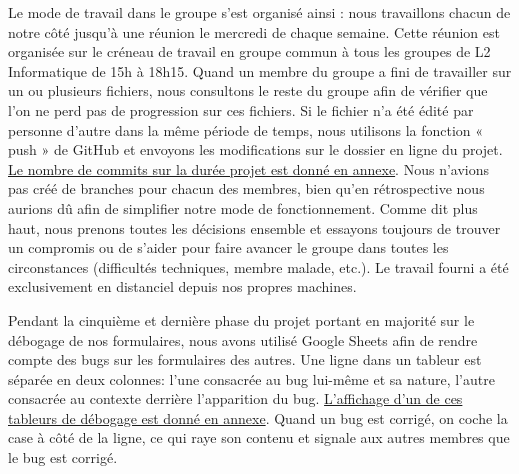 \documentclass[12pt]{report}
\begin{document}
        \bigskip
        \par
        \hypertarget{bdd-retour-gestion}{}
        Le mode de travail dans le groupe s’est organisé ainsi : nous travaillons chacun de notre côté jusqu’à une réunion le mercredi de chaque semaine. Cette réunion est organisée sur le créneau de travail en groupe commun à tous les groupes de L2 Informatique de 15h à 18h15. Quand un membre du groupe a fini de travailler sur un ou plusieurs fichiers, nous consultons le reste du groupe afin de vérifier que l’on ne perd pas de progression sur ces fichiers. Si le fichier n’a été édité par personne d’autre dans la même période de temps, nous utilisons la fonction « push » de GitHub et envoyons les modifications sur le dossier en ligne du projet. \hyperlink{annexe-gestion}{Le nombre de commits sur la durée projet est donné en annexe}. Nous n'avions pas créé de branches pour chacun des membres, bien qu'en rétrospective nous aurions dû afin de simplifier notre mode de fonctionnement. Comme dit plus haut, nous prenons toutes les décisions ensemble et essayons toujours de trouver un compromis ou de s’aider pour faire avancer le groupe dans toutes les circonstances (difficultés techniques, membre malade, etc.). Le travail fourni a été exclusivement en distanciel depuis nos propres machines.
        
        \bigskip
        \par
        Pendant la cinquième et dernière phase du projet portant en majorité sur le débogage de nos formulaires, nous avons utilisé Google Sheets afin de rendre compte des bugs sur les formulaires des autres. Une ligne dans un tableur est séparée en deux colonnes: l'une consacrée au bug lui-même et sa nature, l'autre consacrée au contexte derrière l'apparition du bug. \hyperlink{annexe-gestion}{L'affichage d'un de ces tableurs de débogage est donné en annexe}. Quand un bug est corrigé, on coche la case à côté de la ligne, ce qui raye son contenu et signale aux autres membres que le bug est corrigé.
        
\end{document}
